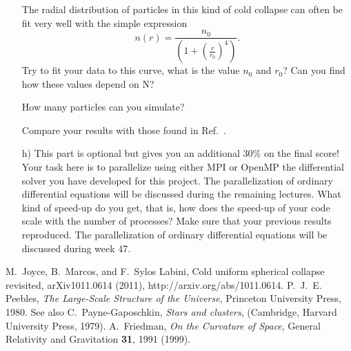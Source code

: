 \documentclass[10pt]{article}
\begin{document}
\begin{enumerate}
The radial distribution of particles in this kind of cold collapse can often be fit very well with the simple expression 
\[ 
n(r) = \frac{n_0}{\left(1 +\left(\frac{r}{r_0}\right)^4\right)}.
\]
Try to fit your data to this curve, what is the value $n_0$ and $r_0$? Can you find how these values depend on N?

How many particles can you simulate?

Compare your results with those found in Ref.~\cite{astrobabes}. 



\item[h)] This part is optional but gives you an additional 30\% on the final score!  
Your task here is to parallelize using either MPI or OpenMP the differential solver you have developed for this project.
The parallelization of ordinary differential equations will be discussed during the remaining lectures. 
What kind of speed-up do you get, that is, how does the speed-up of your code scale with the number of processes? Make sure that your previous results reproduced.  The parallelization of ordinary differential equations will be discussed during week 47.

\end{enumerate}
\begin{thebibliography}{100} 
 M.~Joyce, B.~Marcos, and F.~Sylos Labini, Cold uniform spherical collapse revisited, arXiv1011.0614 (2011), 
http://arxiv.org/abs/1011.0614.
 P.~J.~E. Peebles, \emph{{The Large-Scale Structure of the Universe}}, Princeton
  University Press, 1980. See also C.~Payne-Gaposchkin,  {\em Stars and clusters}, (Cambridge, Harvard University Press, 1979).
 A.~Friedman,  {\em On the Curvature of Space},  General Relativity and Gravitation {\bf 31},  1991 (1999).
\end{thebibliography} 
\end{document}
